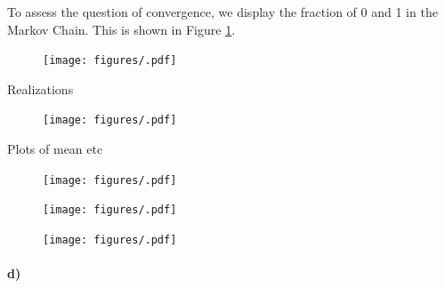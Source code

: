 To assess the question of convergence, we display the fraction of 0 and 1 in the Markov Chain. This is shown in Figure \ref{fig:MCMC_frac}.

\begin{figure}
    \centering
    \texttt{[image: figures/.pdf]}
    \caption{}
    \label{fig:MCMC_frac}
\end{figure}

Realizations
\begin{figure}
    \centering
    \texttt{[image: figures/.pdf]}
    \caption{}
    \label{fig:MCMC_realiz}
\end{figure}

Plots of mean etc

\begin{figure}
    \centering
    \texttt{[image: figures/.pdf]}
    \caption{}
    \label{fig:MCMC_mean}
\end{figure}

\begin{figure}
    \centering
    \texttt{[image: figures/.pdf]}
    \caption{}
    \label{fig:MCMC_var}
\end{figure}

\begin{figure}
    \centering
    \texttt{[image: figures/.pdf]}
    \caption{}
    \label{fig:MCMC_MMAP}
\end{figure}

\paragraph{d)}


